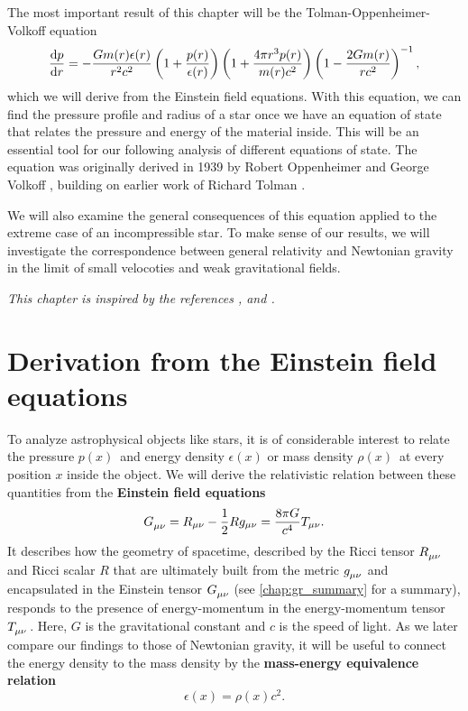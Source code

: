 The most important result of this chapter will be the Tolman-Oppenheimer-Volkoff equation
\begin{equation*}
	\odv{p}{r} = -\frac{G m(r) \epsilon(r)}{r^2 c^2} \left( 1 + \frac{p(r)}{\epsilon(r)} \right) \left( 1 + \frac{4 \pi r^3 p(r)}{m(r) c^2} \right) \left( 1 - \frac{2 G m(r)}{r c^2} \right)^{-1} ,
\end{equation*}
which we will derive from the Einstein field equations.
With this equation, we can find the pressure profile and radius of a star once we have an equation of state that relates the pressure and energy of the material inside.
This will be an essential tool for our following analysis of different equations of state.
The equation was originally derived in 1939 by Robert Oppenheimer and George Volkoff \cite{ref:tov}, building on earlier work of Richard Tolman \cite{ref:tolman}.

We will also examine the general consequences of this equation applied to the extreme case of an incompressible star. 
To make sense of our results, we will investigate the correspondence between general relativity and Newtonian gravity in the limit of small velocoties and weak gravitational fields.

\textit{This chapter is inspired by the references \cite{ref:carroll}, \cite{ref:mtw} and \cite{ref:mika_gr_notes}.}

\section{Derivation from the Einstein field equations}
\label{sec:einstein_to_tov}

To analyze astrophysical objects like stars, it is of considerable interest to relate the pressure $p(x)$ and energy density $\epsilon(x)$ or mass density $\rho(x)$ at every position $x$ inside the object.
We will derive the relativistic relation between these quantities from the \textbf{Einstein field equations} \cite[equation 4.44]{ref:carroll}
\begin{equation}
	G\indices{_\mu_\nu} = R_{\mu \nu} - \frac{1}{2} R g_{\mu \nu} = \frac{8 \pi G}{c^4} T_{\mu \nu} .
	\label{eq:einstein}
\end{equation}
It describes how the geometry of spacetime, described by the Ricci tensor $R\indices{_\mu_\nu}$ and Ricci scalar $R$ that are ultimately built from the metric $g\indices{_\mu_\nu}$ and encapsulated in the Einstein tensor $G\indices{_\mu_\nu}$ (see \cref{chap:gr_summary} for a summary), responds to the presence of energy-momentum in the energy-momentum tensor $T\indices{_\mu_\nu}$.
Here, $G$ is the gravitational constant and $c$ is the speed of light.
As we later compare our findings to those of Newtonian gravity, it will be useful to connect the energy density to the mass density by the \textbf{mass-energy equivalence relation}
\begin{equation}
	\epsilon(x) = \rho(x) c^2 .
	\label{eq:tov:mass_energy_equivalence}
\end{equation}

